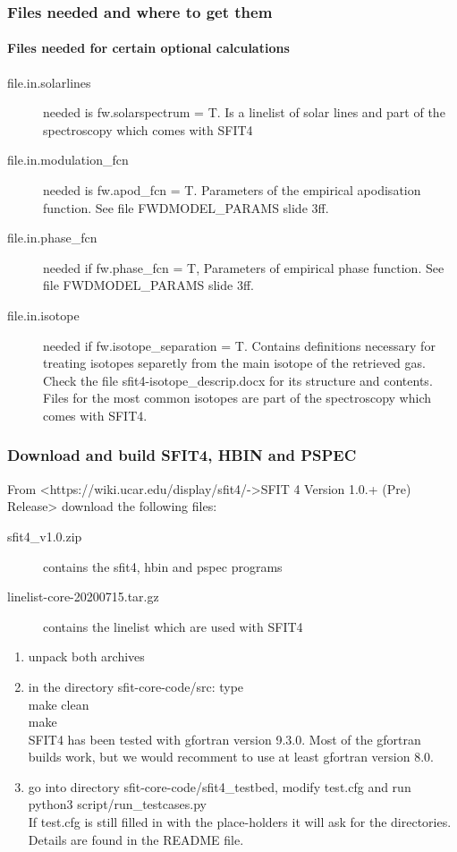\documentclass[notes=hide]{beamer}
\begin{document}
\begin{frame}
  \frametitle{Files needed and where to get them}
  \framesubtitle{Files needed for certain optional calculations}
  \begin{description}
  \item[file.in.solarlines] needed is fw.solarspectrum = T. Is a
    linelist of solar lines and part of the spectroscopy which comes
    with SFIT4
  \item[file.in.modulation\_fcn] needed is fw.apod\_fcn =
    T. Parameters of the empirical apodisation function. See file
    FWDMODEL\_PARAMS slide 3ff.
  \item[file.in.phase\_fcn] needed if fw.phase\_fcn = T, Parameters of
    empirical phase function. See file
    FWDMODEL\_PARAMS slide 3ff. 
  \item[file.in.isotope] needed if fw.isotope\_separation =
    T. Contains definitions necessary for treating isotopes separetly
    from the main isotope of the retrieved gas. Check the file
    sfit4-isotope\_descrip.docx for its structure and
    contents. Files for the most common isotopes are part of the
    spectroscopy which comes with SFIT4.
  \end{description}
\end{frame}

\begin{frame}
  \frametitle{Download and build SFIT4, HBIN and PSPEC}
  From <https://wiki.ucar.edu/display/sfit4/->SFIT 4 Version 1.0.+
  (Pre) Release> download the following files:
  \begin{description}
  \item [sfit4\_v1.0.zip] contains the sfit4, hbin and pspec programs
  \item[linelist-core-20200715.tar.gz]  contains the linelist which
    are used with SFIT4
  \end{description}
  \begin{enumerate}
  \item unpack both archives
  \item in the directory sfit-core-code/src: type\\
    make clean\\
    make\\
    SFIT4 has been tested with gfortran version 9.3.0. Most of the
    gfortran builds work, but we would recomment to use at least
    gfortran version 8.0.
  \item go into directory sfit-core-code/sfit4\_testbed, modify
    test.cfg and run\\
    python3 script/run\_testcases.py\\
    If test.cfg is still filled in with the place-holders it will ask
    for the directories. Details are found in the README file.
  \end{enumerate}
\end{frame}
\end{document}
